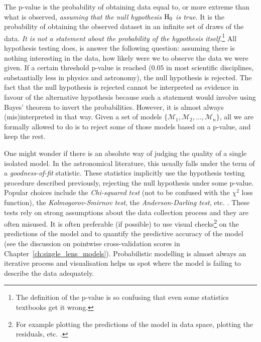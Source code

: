 \documentclass[12pt,dvipsnames]{report}
\begin{document}
The p-value is the probability of obtaining data equal to, or more extreme than 
what is observed, \emph{assuming that the null hypothesis $\textrm H_0$ is true}.
It is the probability of obtaining the observed
dataset in an infinite set of draws of the data.
\emph{It is not a statement 
about the probability of the hypothesis itself.}\footnote{The definition of the p-value
is so confusing that even some statistics textbooks get it wrong.}
All hypothesis testing does, is answer the following question:
assuming there is nothing interesting in the data, how likely were we to observe 
the data we were given.
If a certain threshold p-value is reached ($0.05$ in most scientific disciplines, 
substantially less in physics and astronomy), the null hypothesis 
is rejected.
The fact that the null hypothesis is rejected cannot be interpreted as evidence in
favour of the alternative hypothesis because such a statement would involve
using Bayes' theorem to invert the probabilities. However, it is almost always
(mis)interpreted in that way.
Given a set of models $\{\mathcal{M}_1,\mathcal{M}_2,\dots,\mathcal{M}_n\}$, all
we are formally allowed to do is to  reject some of those models based on 
a p-value, and keep the rest.


One might wonder if there is an absolute way of judging the quality of a
single isolated model. In the astronomical literature, this usually falls under the term of
a \emph{goodness-of-fit} statistic. These statistics implicitly use the 
hypothesis testing procedure described previously, rejecting the null hypothesis 
under some p-value. Popular choices include the \emph{Chi-squared test} 
(not to be confused with the $\chi^2$ loss function),
the \emph{Kolmogorov-Smirnov test}, the \emph{Anderson-Darling test}, etc. .
These tests rely on strong assumptions about the data collection process 
and they are often misused. 
It is often preferable (if possible) to use visual checks\footnote{For example plotting the predictions of the model in data space, plotting 
the residuals, etc. .} on the predictions 
of the model \citep[see][for a visualisation guide in the Bayesian paradigm]{arXiv:1709.01449}
and to quantify the predictive accuracy of the model (see the discussion on pointwise cross-validation 
scores in Chapter~\ref{ch:single_lens_models}).
  Probabilistic modelling is almost always an iterative 
process and visualisation helps us spot where the model is failing to describe 
the data adequately.
\end{document}
